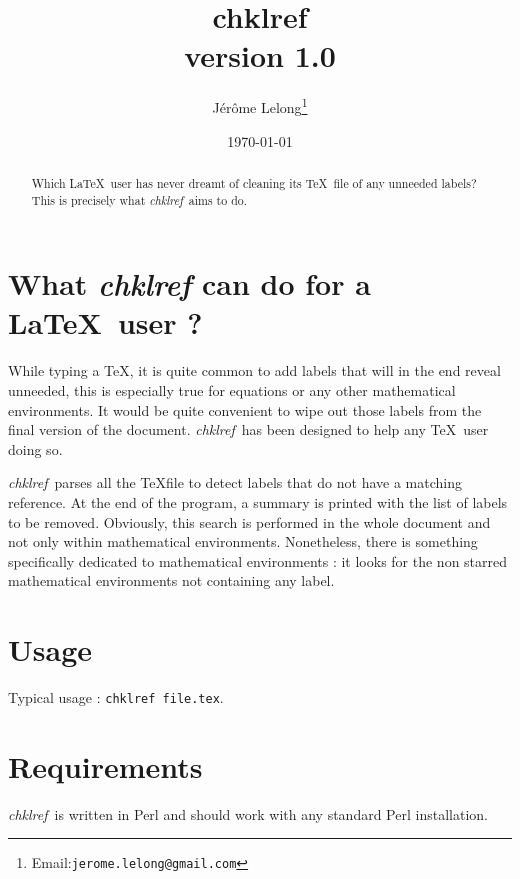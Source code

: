 \documentclass[a4paper,11pt,twoside]{article}
\title{chklref\\
{\large version 1.0}}
\date{\today}
\author{J\'er\^ome Lelong\footnote{Email:\texttt{jerome.lelong@gmail.com}}}
\def\chk{{\it chklref}}
\begin{document}
\maketitle

\begin{abstract}
  Which \LaTeX\ user has never dreamt of cleaning its \TeX\ file of any
  unneeded labels? This is precisely what \chk\ aims to do. 
\end{abstract}

\section{What {\it chklref} can do for a \LaTeX\ user ?}

While typing a \TeX, it is quite common to add labels that will in the end
reveal unneeded, this is especially true for equations or any other mathematical
environments. It would be quite convenient to wipe out those labels from the
final version of the document. \chk\ has been designed to help any \TeX\
user doing so.

\chk\ parses all the \TeX file to detect labels that do not have a matching
reference. At the end of the program, a summary is printed with the list of
labels to be removed. Obviously, this search is performed in the whole document
and not only within mathematical environments. Nonetheless, there is something
specifically dedicated to mathematical environments : it looks for the non
starred mathematical environments not containing any label.



\section{Usage}

Typical usage : \verb!chklref file.tex!.

\section{Requirements}

\chk\ is written in Perl and should work with any standard Perl installation.
\end{document}
